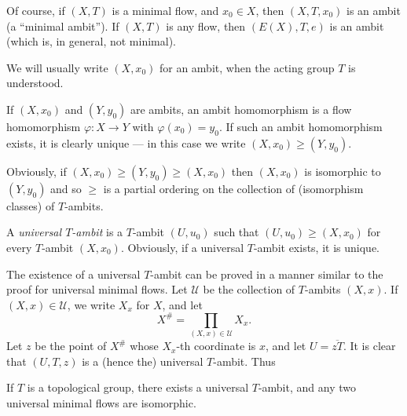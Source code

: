 Of course, if $(X,T)$ is a minimal flow, and $x_0 \in X$, then $(X,T,x_0)$ is an ambit (a ``minimal ambit''). If $(X,T)$ is any flow, then $(E(X),T,e)$ is an ambit (which is, in general, not minimal).



We will usually write $(X,x_0)$ for an ambit, when the acting group $T$ is understood.

If $(X,x_0)$ and $(Y,y_0)$ are ambits, an ambit homomorphism is a flow homomorphism $\varphi : X \to Y$ with $\varphi(x_0)=y_0$. If such an ambit homomorphism exists, it is clearly unique --- in this case we write $(X,x_0) \ge (Y,y_0)$.

Obviously, if $(X,x_0) \ge (Y,y_0) \ge (X,x_0)$ then $(X,x_0)$ is isomorphic to $(Y,y_0)$ and so $\ge$ is a partial ordering on the collection of (isomorphism classes) of $T$-ambits.

A \emph{universal $T$-ambit} is a $T$-ambit $(U,u_0)$ such that $(U,u_0) \ge (X,x_0)$ for every $T$-ambit $(X,x_0)$. Obviously, if a universal $T$-ambit exists, it is unique.

The existence of a universal $T$-ambit can be proved in a manner similar to the proof for universal minimal flows. Let $\mathcal{U}$ be the collection of $T$-ambits $(X,x)$. If $(X,x)\in \mathcal{U}$, we write $X_x$ for $X$, and let
\[
    X^{\#}=\prod_{(X,x)\in \mathcal{U}} X_x.
\]
Let $z$ be the point of $X^{\#}$ whose $X_x$-th coordinate is $x$, and let $U=\overline{zT}$. It is clear that $(U,T,z)$ is a (hence the) universal $T$-ambit. Thus



\begin{theorem}
    \label{thm:universal_T_ambit_existence_uniqueness}
    If $T$ is a topological group, there exists a universal $T$-ambit, and any two universal minimal flows are isomorphic.
\end{theorem}

